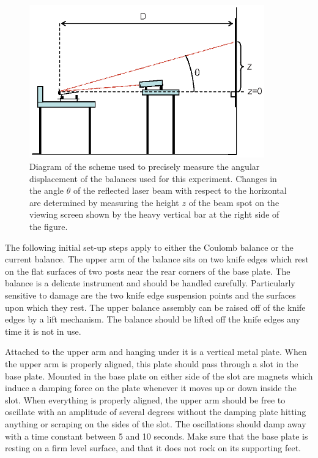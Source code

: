 \documentclass{revtex4}
\begin{document}
\begin{figure}
\includegraphics[width=4in]{distances.eps}
\caption{\label{fig:distances}
Diagram of the scheme used to precisely measure the angular displacement
of the balances used for this experiment.  Changes in the angle $\theta$ of
the reflected laser beam with respect to the horizontal are determined by
measuring the height $z$ of the beam spot on the viewing screen shown by 
the heavy vertical bar at the right side of the figure.
}
\end{figure}

The following initial set-up steps apply to either  the Coulomb balance
or the current balance.  The upper arm of the balance sits on two knife
edges which rest on the flat surfaces of two posts near the rear corners
of the base plate.  The balance is a delicate instrument and should be
handled carefully.  Particularly sensitive to damage are the two
knife edge suspension points and the surfaces upon which they
rest. The upper balance assembly can be raised off of the knife
edges by a lift mechanism.  The balance should be lifted off the
knife edges any time it is not in use.

Attached to the upper arm and hanging under it is
a vertical metal plate.  When the upper arm is properly aligned, this
plate should pass through a slot in the base plate.  Mounted in the base
plate on either side of the slot are magnets which induce a damping force
on the plate whenever it moves up or down inside the slot.  When everything
is properly aligned, the upper arm should be free to oscillate with an
amplitude of several degrees without the damping plate hitting anything or
scraping on the sides of the slot.  The oscillations should damp away with
a time constant between 5 and 10 seconds.  Make sure that the base plate
is resting on a firm level surface, and that it does not rock on its
supporting feet.  
\end{document}
